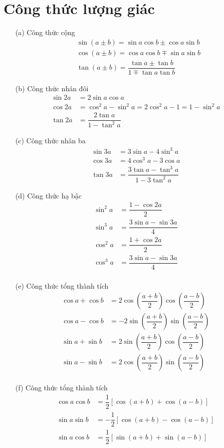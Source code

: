 \documentclass{report}
\newcommand{\f}[2]{\dfrac{#1}{#2}}
\begin{document}
\section*{Công thức lượng giác}
\begin{enumerate}
	\item[(a)]  Công thức cộng
		\begin{align*}
			 & \sin (a \pm b) = \sin a \cos b \pm \cos a \sin b            \\
			 & \cos (a \pm b) = \cos a \cos b \mp \sin a \sin b            \\
			 & \tan (a \pm b) = \f{\tan a \pm \tan b}{1 \mp \tan a \tan b}
		\end{align*}
	\item[(b)] Công thức nhân đôi
		\begin{align*}
			\sin 2a & = 2 \sin a \cos a                                     \\
			\cos 2a & = \cos^2 a - \sin^2 a = 2 \cos^2 a - 1 = 1 - \sin^2 a \\
			\tan 2a & = \f{2\tan a}{1 - \tan^2 a}
		\end{align*}
	\item[(c)] Công thức nhân ba
		\begin{align*}
			\sin 3a & = 3 \sin a - 4 \sin^3 a                 \\
			\cos 3a & = 4 \cos^3 a - 3 \cos a                 \\
			\tan 3a & = \f{3\tan a - \tan^3 a}{1 - 3\tan^2 a}
		\end{align*}
	\item[(d)] Công thức hạ bậc
		\begin{align*}
			\sin^2 a & = \f{1-\cos 2a}{2}        \\
			\sin^3 a & = \f{3\sin a - \sin3a}{4} \\
			\cos^2 a & = \f{1+\cos 2a}{2}        \\
			\cos^3 a & = \f{3\sin a - \sin3a}{4} \\
		\end{align*}
	\item[(e)] Công thức tổng thành tích
		\begin{align*}
			\cos a + \cos b & = 2\cos(\f{a+b}{2})\cos(\f{a-b}{2})  \\
			\cos a - \cos b & = -2\sin(\f{a+b}{2})\sin(\f{a-b}{2}) \\
			\sin a + \sin b & = 2\sin(\f{a+b}{2})\cos(\f{a-b}{2})  \\
			\sin a - \sin b & = 2\cos(\f{a+b}{2})\sin(\f{a-b}{2})  \\
		\end{align*}
	\item[(f)] Công thức tổng thành tích
		\begin{align*}
			\cos a \cos b & = \f{1}{2} \left[ \cos(a+b) + \cos(a-b) \right]  \\
			\sin a \sin b & = -\f{1}{2} \left[ \cos(a+b) - \cos(a-b) \right] \\
			\sin a \cos b & = \f{1}{2} \left[ \sin(a+b) + \sin(a-b) \right]
		\end{align*}
\end{enumerate}
\end{document}
